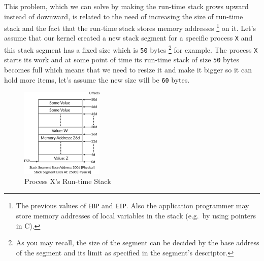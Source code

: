 This problem, which we can solve by making the run-time stack grows
upward instead of downward, is related to the need of increasing the
size of run-time stack and the fact that the run-time stack stores
memory addresses \footnote{The previous values of \lstinline!EBP! and
  \lstinline!EIP!. Also the application programmer may store memory
  addresses of local variables in the stack (e.g.~by using pointers in
  C).} on it. Let's assume that our kernel created a new stack segment
for a specific process \lstinline!X! and this stack segment has a fixed
size which is \lstinline!50! bytes \footnote{As you may recall, the size
  of the segment can be decided by the base address of the segment and
  its limit as specified in the segment's descriptor.} for example. The
process \lstinline!X! starts its work and at some point of time its
run-time stack of size \lstinline!50! bytes becomes full which means
that we need to resize it and make it bigger so it can hold more items,
let's assume the new size will be \lstinline!60! bytes.

\begin{figure}
\centering
\includegraphics[width=0.35000\textwidth]{Figures/x86-ch/Fig10062021_3.png}
\caption{Process X's Run-time Stack}\label{fig:10062021_3}
\end{figure}

